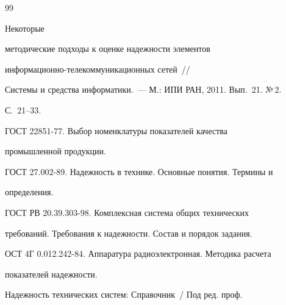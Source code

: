    {\small\frenchspacing


{%




\begin{thebibliography}{99}


    




      Некоторые 


методические подходы к оценке надежности элементов 


     ин\-фор\-ма\-ци\-он\-но-те\-ле\-ком\-му\-ни\-ка\-ци\-он\-ных сетей~/\!\!/ 


Системы и средства информатики.~--- М.: ИПИ РАН, 2011. Вып.~21. №\,2. 


С.~21--33.







     ГОСТ 22851-77. Выбор номенклатуры показателей качества 


промышленной продукции.







     ГОСТ 27.002-89. Надежность в технике. Основные понятия. Термины и 


определения.







     ГОСТ РВ 20.39.303-98. Комплексная система общих технических 


требований. Требования к надежности. Состав и порядок задания.







     ОСТ 4Г 0.012.242-84. Аппаратура радиоэлектронная. Методика расчета 


показателей надежности.












     Надежность технических систем: Справочник~/ Под ред. проф. 



\end{thebibliography}}}

